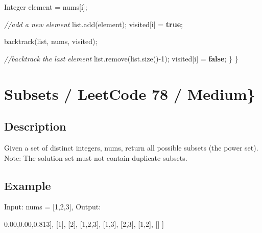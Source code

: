 \documentclass[]{book}
\newenvironment{Shaded}{\begin{snugshade}}{\end{snugshade}}
\newcommand{\BuiltInTok}[1]{#1}
\newcommand{\CommentTok}[1]{\textcolor[rgb]{0.56,0.35,0.01}{\textit{#1}}}
\newcommand{\DecValTok}[1]{\textcolor[rgb]{0.00,0.00,0.81}{#1}}
\newcommand{\FunctionTok}[1]{\textcolor[rgb]{0.00,0.00,0.00}{#1}}
\newcommand{\KeywordTok}[1]{\textcolor[rgb]{0.13,0.29,0.53}{\textbf{#1}}}
\newcommand{\NormalTok}[1]{#1}
\begin{document}
\begin{Shaded}
\begin{Highlighting}[]
        \BuiltInTok{Integer}\NormalTok{ element = nums[i];}

        \CommentTok{//add a new element}
\NormalTok{        list.}\FunctionTok{add}\NormalTok{(element);}
\NormalTok{        visited[i] = }\KeywordTok{true}\NormalTok{;}

        \FunctionTok{backtrack}\NormalTok{(list, nums, visited);}

        \CommentTok{//backtrack the last element}
\NormalTok{        list.}\FunctionTok{remove}\NormalTok{(list.}\FunctionTok{size}\NormalTok{()-}\DecValTok{1}\NormalTok{);}
\NormalTok{        visited[i] = }\KeywordTok{false}\NormalTok{;}
\NormalTok{    \}}
\NormalTok{\}}
\end{Highlighting}
\end{Shaded}

\hypertarget{subsets-leetcode-78-medium}{%
\section{Subsets / LeetCode 78 / Medium\}}\label{subsets-leetcode-78-medium}}

\hypertarget{description-16}{%
\subsection{Description}\label{description-16}}

Given a set of distinct integers, nums, return all possible subsets (the power set).
Note: The solution set must not contain duplicate subsets.

\hypertarget{example-15}{%
\subsection{Example}\label{example-15}}

Input: nums = {[}1,2,3{]}, Output:

\begin{Shaded}
\begin{Highlighting}[]
\NormalTok{[}
\NormalTok{    [}\DecValTok{3}\NormalTok{],}
\NormalTok{    [}\DecValTok{1}\NormalTok{],}
\NormalTok{    [}\DecValTok{2}\NormalTok{],}
\NormalTok{    [}\DecValTok{1}\NormalTok{,}\DecValTok{2}\NormalTok{,}\DecValTok{3}\NormalTok{],}
\NormalTok{    [}\DecValTok{1}\NormalTok{,}\DecValTok{3}\NormalTok{],}
\NormalTok{    [}\DecValTok{2}\NormalTok{,}\DecValTok{3}\NormalTok{],}
\NormalTok{    [}\DecValTok{1}\NormalTok{,}\DecValTok{2}\NormalTok{],}
\NormalTok{    []}
\NormalTok{]}
\end{Highlighting}
\end{Shaded}
\end{document}
